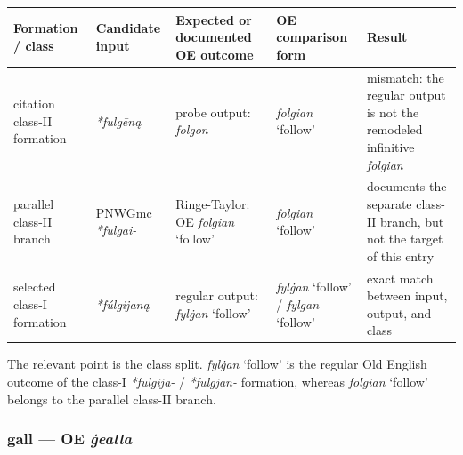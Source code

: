 \documentclass[
  british,
  a4paper,
]{article}
\newcounter{none} %
\begin{document}
{\def\LTcaptype{none} %
\begin{longtable}[]{@{}
  >{\raggedright\arraybackslash}p{}
  >{\raggedright\arraybackslash}p{}
  >{\raggedright\arraybackslash}p{}
  >{\raggedright\arraybackslash}p{}
  >{\raggedright\arraybackslash}p{}@{}}
\toprule\noalign{}
\begin{minipage}[b]{\linewidth}\raggedright
Formation / class
\end{minipage} & \begin{minipage}[b]{\linewidth}\raggedright
Candidate input
\end{minipage} & \begin{minipage}[b]{\linewidth}\raggedright
Expected or documented OE outcome
\end{minipage} & \begin{minipage}[b]{\linewidth}\raggedright
OE comparison form
\end{minipage} & \begin{minipage}[b]{\linewidth}\raggedright
Result
\end{minipage} \\
\midrule\noalign{}
\endhead
\bottomrule\noalign{}
\endlastfoot
citation class-II formation & {\emph{*fulgēną}} & probe output:
{\emph{folgon}} & {\emph{folgian}} `follow' & mismatch: the regular
output is not the remodeled infinitive \emph{folgian} \\
parallel class-II branch & PNWGmc \emph{*fulgai-} & Ringe-Taylor: OE
{\emph{folgian}} `follow' & {\emph{folgian}} `follow' & documents the
separate class-II branch, but not the target of this entry \\
selected class-I formation & {\emph{*fúlgijaną}} & regular output:
{\emph{fylġan}} `follow' & {\emph{fylġan}} `follow' / {\emph{fylgan}}
`follow' & exact match between input, output, and class \\
\end{longtable}
}

The relevant point is the class split. {\emph{fylġan}} `follow' is the
regular Old English outcome of the class-I \emph{*fulgija-} /
\emph{*fulgjan-} formation, whereas {\emph{folgian}} `follow' belongs to
the parallel class-II branch.

\subsubsection{\texorpdfstring{gall --- OE
\emph{ġealla}}{gall --- OE ġealla}}\label{gall-oe-ux121ealla}
\end{document}
